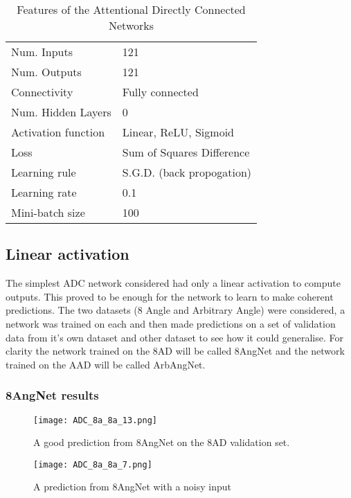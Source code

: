 \begin{table}[h]
\centering
\begin{tabular}{ | l | l | }
    \hline
    Num. Inputs & 121 \\
    Num. Outputs & 121 \\
    Connectivity & Fully connected \\
    Num. Hidden Layers & 0 \\
    Activation function & Linear, ReLU, Sigmoid \\
    Loss & Sum of Squares Difference \\
    Learning rule & S.G.D. (back propogation) \\
    Learning rate & 0.1 \\
    Mini-batch size & 100 \\
    \hline
\end{tabular}
\caption{Features of the Attentional Directly Connected Networks}
\label{tb:attnet1def}
\end{table}

\subsection{Linear activation}
The simplest ADC network considered had only a linear activation to compute outputs. 
This proved to be enough for the network to learn to make coherent predictions. 
The two datasets (8 Angle and Arbitrary Angle) were considered, a network was trained on each and then made predictions on a set of validation data from it's own dataset and other dataset to see how it could generalise.
For clarity the network trained on the 8AD will be called 8AngNet and the network trained on the AAD will be called ArbAngNet. 

\subsubsection{8AngNet results}

\begin{figure}
    \centering
    \texttt{[image: ADC\_8a\_8a\_13.png]}
    \caption{A good prediction from 8AngNet on the 8AD validation set.}
    \label{fig:ADC_8a_8a_crct} 
\end{figure}

\begin{figure}
    \centering
    \texttt{[image: ADC\_8a\_8a\_7.png]}
    \caption{A prediction from 8AngNet with a noisy input}
    \label{fig:ADC_8a_8a_noisy}
\end{figure}

